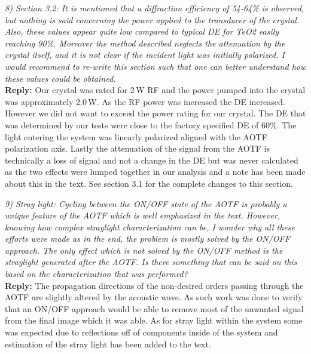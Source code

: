 \documentclass[12pt, notitlepage]{article}
\begin{document}
\hrulefill

\textit{8) Section 3.2: It is mentioned that a diffraction efficiency of 54-64\% is observed, but
nothing is said concerning the power applied to the transducer of the crystal. Also,
these values appear quite low compared to typical DE for TeO2 easily reaching 90\%.
Moreover the method described neglects the attenuation by the crystal itself, and it is
not clear if the incident light was initially polarized. I would recommend to re-write this
section such that one can better understand how these values could be obtained.}\\

\textbf{Reply:} Our crystal was rated for 2\,W RF and the power pumped into the crystal was approximately 2.0\,W. As the RF power was increased the DE increased. However we did not want to exceed the power rating for our crystal. The DE that was determined by our tests were close to the factory specified DE of 60\%. The light entering the system was linearly polarized aligned with the AOTF polarization axis. Lastly the attenuation of the signal from the AOTF is technically a loss of signal and not a change in the DE but was never calculated as the two effects were lumped together in our analysis and a note has been made about this in the text. See section 3.1 for the complete changes to this section.

\hrulefill

\textit{9) Stray light: Cycling between the ON/OFF state of the AOTF is probably a unique
feature of the AOTF which is well emphasized in the text. However, knowing how
complex straylight characterization can be, I wonder why all these efforts were made
as in the end, the problem is mostly solved by the ON/OFF approach. The only effect
which is not solved by the ON/OFF method is the straylight generated after the AOTF.
Is there something that can be said on this based on the characterization that was
performed?}\\

\textbf{Reply:} The propagation directions of the non-desired orders passing through the AOTF are slightly altered by the acoustic wave. As such work was done to verify that an ON/OFF approach would be able to remove most of the unwanted signal from the final image which it was able. As for stray light within the system some was expected due to reflections off of components inside of the system and estimation of the stray light has been added to the text.

\hrulefill
\end{document}
